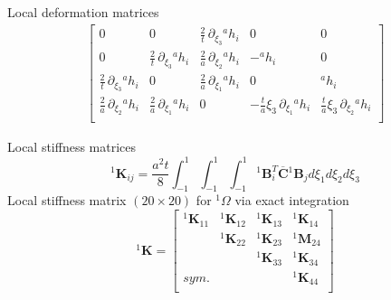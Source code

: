 \documentclass[aspectratio=169]{beamer}
\begin{document}
\begin{frame}{Local deformation matrices}
\begin{align*}
\begin{bmatrix}
                         0                                       & 0                                       & \frac{2}{t} \, \partial_{\xi_3}{}^a h_i & 0                                             & 0                                            \\[0.4em]
                         0                                       & \frac{2}{t} \, \partial_{\xi_3}{}^a h_i & \frac{2}{a} \, \partial_{\xi_2}{}^a h_i & -{}^a h_i                                     & 0                                            \\[0.4em]
                         \frac{2}{t} \, \partial_{\xi_3}{}^a h_i & 0                                       & \frac{2}{a} \, \partial_{\xi_1}{}^a h_i & 0                                             & {}^a h_i                                     \\[0.4em]
                         \frac{2}{a} \, \partial_{\xi_2}{}^a h_i & \frac{2}{a} \, \partial_{\xi_1}{}^a h_i & 0                                       & -\frac{t}{a}\xi_3 \, \partial_{\xi_1}{}^a h_i & \frac{t}{a}\xi_3 \, \partial_{\xi_2}{}^a h_i \\
                       \end{bmatrix}
  \end{align*}
\end{frame}


\begin{frame}{Local stiffness matrices}
  $${}^1\mathbf K_{ij}=\frac{a^2t}{8}\int_{-1}^1\int_{-1}^1\int_{-1}^1{}^1\mathbf B_i^T\overline{\mathbf C} {}^1\mathbf B_j d\xi_1d\xi_2d\xi_3 $$
  Local stiffness matrix  $(20\times 20)$ for ${}^1\Omega$ via exact integration
  $${}^1\mathbf K= \begin{bmatrix}
      {}^1\mathbf K_{11} & {}^1\mathbf K_{12} & {}^1\mathbf K_{13} & {}^1\mathbf K_{14} \\
                         & {}^1\mathbf K_{22} & {}^1\mathbf K_{23} & {}^1\mathbf M_{24} \\
                         &                    & {}^1\mathbf K_{33} & {}^1\mathbf K_{34} \\
      sym.               &                    &                    & {}^1\mathbf K_{44} \\
    \end{bmatrix}$$
\end{frame}
\end{document}
